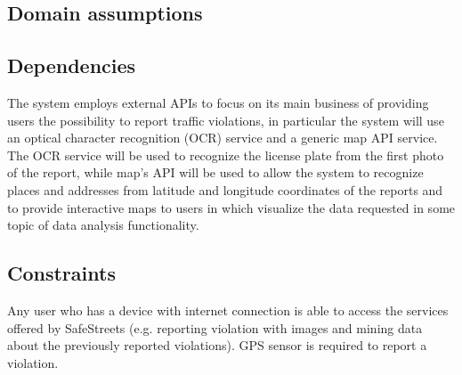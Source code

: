 \subsection{Domain assumptions}

\begin{enumerate}[label={D\arabic*.}]
	 \label{D_email}
     \label{D_reports}
     \label{D_mun_availability}
   	 \label{D_mun_accuracy}
     \label{D_supervisor}
     \label{D_gps}
     \label{D_internet}
     \label{D_city_auth}
     \label{D_pce}
     \label{D_pce_api}
    \label{D_unique_license_plate}
\end{enumerate}


\subsection{Dependencies}

The system employs external APIs to focus on its main business of providing users the possibility to report traffic violations, in particular the system will use an optical character recognition (OCR) service and a generic map API service. The OCR service will be used to recognize the license plate from the first photo of the report, while map's API will be used to allow the system to recognize places and addresses from latitude and longitude coordinates of the reports and to provide interactive maps to users in which visualize the data requested in some topic of data analysis functionality.

\subsection{Constraints}

Any user who has a device with internet connection is able to access the services offered by SafeStreets (e.g. reporting violation with images and mining data about the previously reported violations). GPS sensor is required to report a violation.

